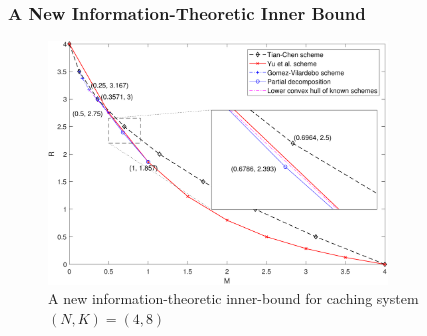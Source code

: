 \documentclass{beamer}
\begin{document}
\begin{frame}
\frametitle{A New Information-Theoretic Inner Bound}
\begin{figure}[]
\centering
\includegraphics[width=9cm]{N4K8.pdf}\\
{\footnotesize A new information-theoretic inner-bound for caching system $(N,K)=(4,8)$}
\end{figure}
\end{frame}
\end{document}
